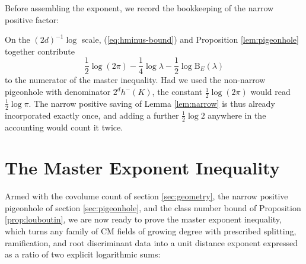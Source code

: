Before assembling the exponent, we record the bookkeeping of the narrow positive factor:
\begin{remark}\label{rem:narrow-bookkeeping}
On the $(2d)^{-1}\log$ scale, (\ref{eq:hminus-bound}) and Proposition \ref{lem:pigeonhole} together contribute
\[
   \frac12\log(2\pi)-\frac14\log\lambda-\frac12\log \mathrm{B}_E(\lambda)
\]
to the numerator of the master inequality.  Had we used the non-narrow pigeonhole with denominator $2^dh^-(K)$, the constant $\frac12\log(2\pi)$ would read $\frac12\log\pi$.  The narrow positive saving of Lemma \ref{lem:narrow} is thus already incorporated exactly once, and adding a further $\frac12\log2$ anywhere in the accounting would count it twice.
\end{remark}

\section{The Master Exponent Inequality}\label{sec:master}

Armed with the covolume count of section \ref{sec:geometry}, the narrow positive pigeonhole of section \ref{sec:pigeonhole}, and the class number bound of Proposition \ref{prop:louboutin}, we are now ready to prove the master exponent inequality, which turns any family of CM fields of growing degree with prescribed splitting, ramification, and root discriminant data into a unit distance exponent expressed as a ratio of two explicit logarithmic sums:

